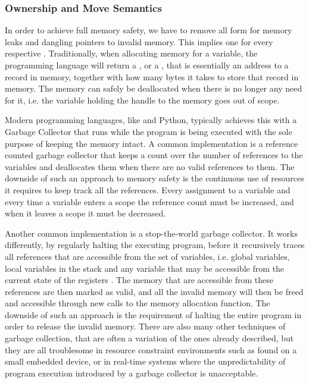 \subsubsection{Ownership and Move Semantics}
\label{sec:back:rust:own}

In order to achieve full memory safety, we have to remove all form for memory leaks and dangling pointers to invalid memory.
This implies one  for every respective .
Traditionally, when allocating memory for a variable, the programming language will return a ,  or a , that is essentially an address to a record in memory, together with how many bytes it takes to store that record in memory.
The memory can safely be deallocated when there is no longer any need for it, i.e. the variable holding the handle to the memory goes out of scope.

Modern programming languages, like {\Java} and Python, typically achieves this with a Garbage Collector that runs while the program is being executed with the sole purpose of keeping the memory intact.
A common implementation is a reference counted garbage collector that keeps a count over the number of references to the variables and deallocates them when there are no valid references to them.
The downside of such an approach to memory safety is the continuous use of resources it requires to keep track all the references.
Every assignment to a variable and every time a variable enters a scope the reference count must be increased, and when it leaves a scope it must be decreased.

Another common implementation is a stop-the-world garbage collector.
It works differently, by regularly halting the executing program, before it recursively traces all references that are accessible from the  set of variables, i.e. global variables, local variables in the stack and any variable that may be accessible from the current state of the registers \cite{Wilson1992}.
The memory that are accessible from these references are then marked as valid, and all the invalid memory will then be freed and accessible through new calls to the memory allocation function.
The downside of such an approach is the requirement of halting the entire program in order to release the invalid memory.
There are also many other techniques of garbage collection, that are often a variation of the ones already described, but they are all troublesome in resource constraint environments such as found on a small embedded device, or in real-time systems where the unpredictability of program execution introduced by a garbage collector is unacceptable.

